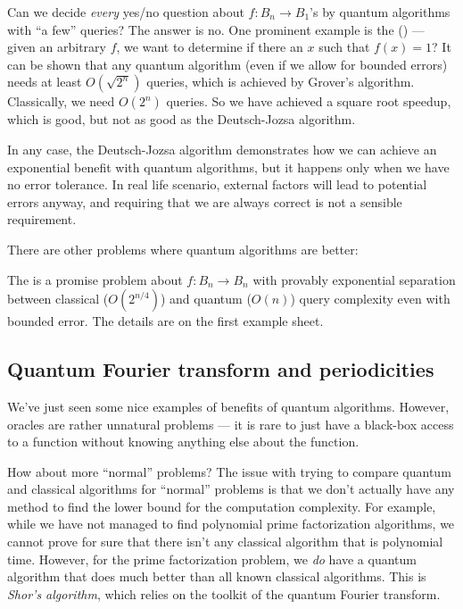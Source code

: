 \documentclass[a4paper]{article}
\begin{document}
Can we decide \emph{every} yes/no question about $f: B_n \to B_1$'s by quantum algorithms with ``a few'' queries? The answer is no. One prominent example is the  () --- given an arbitrary $f$, we want to determine if there an $x$ such that $f(x) = 1$? It can be shown that any quantum algorithm (even if we allow for bounded errors) needs at least $O(\sqrt{2^n})$ queries, which is achieved by Grover's algorithm. Classically, we need $O(2^n)$ queries. So we have achieved a square root speedup, which is good, but not as good as the Deutsch-Jozsa algorithm.

In any case, the Deutsch-Jozsa algorithm demonstrates how we can achieve an exponential benefit with quantum algorithms, but it happens only when we have no error tolerance. In real life scenario, external factors will lead to potential errors anyway, and requiring that we are always correct is not a sensible requirement.

There are other problems where quantum algorithms are better:
\begin{eg}
  The  is a promise problem about $f: B_n \to B_n$ with provably exponential separation between classical ($O(2^{n/4})$) and quantum ($O(n)$) query complexity even with bounded error. The details are on the first example sheet.
\end{eg}

\subsection{Quantum Fourier transform and periodicities}
We've just seen some nice examples of benefits of quantum algorithms. However, oracles are rather unnatural problems --- it is rare to just have a black-box access to a function without knowing anything else about the function.

How about more ``normal'' problems? The issue with trying to compare quantum and classical algorithms for ``normal'' problems is that we don't actually have any method to find the lower bound for the computation complexity. For example, while we have not managed to find polynomial prime factorization algorithms, we cannot prove for sure that there isn't any classical algorithm that is polynomial time. However, for the prime factorization problem, we \emph{do} have a quantum algorithm that does much better than all known classical algorithms. This is \emph{Shor's algorithm}, which relies on the toolkit of the quantum Fourier transform.
\end{document}
